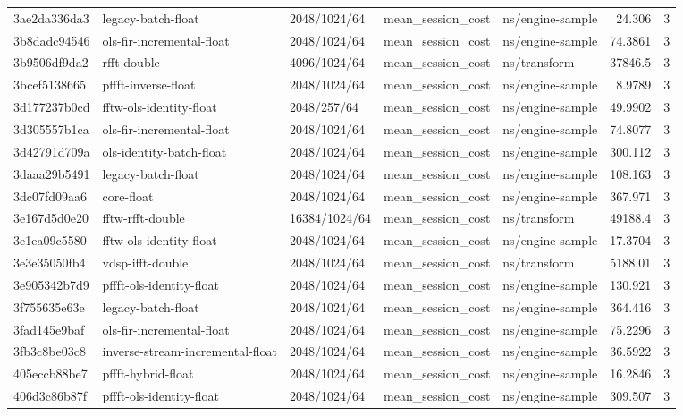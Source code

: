 \begin{longtable}{lllllrr}
3ae2da336da3 & legacy-batch-float & 2048/1024/64 & mean\_session\_cost & ns/engine-sample & 24.306 & 3 \\
3b8dadc94546 & ols-fir-incremental-float & 2048/1024/64 & mean\_session\_cost & ns/engine-sample & 74.3861 & 3 \\
3b9506df9da2 & rfft-double & 4096/1024/64 & mean\_session\_cost & ns/transform & 37846.5 & 3 \\
3bcef5138665 & pffft-inverse-float & 2048/1024/64 & mean\_session\_cost & ns/engine-sample & 8.9789 & 3 \\
3d177237b0cd & fftw-ols-identity-float & 2048/257/64 & mean\_session\_cost & ns/engine-sample & 49.9902 & 3 \\
3d305557b1ca & ols-fir-incremental-float & 2048/1024/64 & mean\_session\_cost & ns/engine-sample & 74.8077 & 3 \\
3d42791d709a & ols-identity-batch-float & 2048/1024/64 & mean\_session\_cost & ns/engine-sample & 300.112 & 3 \\
3daaa29b5491 & legacy-batch-float & 2048/1024/64 & mean\_session\_cost & ns/engine-sample & 108.163 & 3 \\
3dc07fd09aa6 & core-float & 2048/1024/64 & mean\_session\_cost & ns/engine-sample & 367.971 & 3 \\
3e167d5d0e20 & fftw-rfft-double & 16384/1024/64 & mean\_session\_cost & ns/transform & 49188.4 & 3 \\
3e1ea09c5580 & fftw-ols-identity-float & 2048/1024/64 & mean\_session\_cost & ns/engine-sample & 17.3704 & 3 \\
3e3e35050fb4 & vdsp-ifft-double & 2048/1024/64 & mean\_session\_cost & ns/transform & 5188.01 & 3 \\
3e905342b7d9 & pffft-ols-identity-float & 2048/1024/64 & mean\_session\_cost & ns/engine-sample & 130.921 & 3 \\
3f755635e63e & legacy-batch-float & 2048/1024/64 & mean\_session\_cost & ns/engine-sample & 364.416 & 3 \\
3fad145e9baf & ols-fir-incremental-float & 2048/1024/64 & mean\_session\_cost & ns/engine-sample & 75.2296 & 3 \\
3fb3c8be03c8 & inverse-stream-incremental-float & 2048/1024/64 & mean\_session\_cost & ns/engine-sample & 36.5922 & 3 \\
405eccb88be7 & pffft-hybrid-float & 2048/1024/64 & mean\_session\_cost & ns/engine-sample & 16.2846 & 3 \\
406d3c86b87f & pffft-ols-identity-float & 2048/1024/64 & mean\_session\_cost & ns/engine-sample & 309.507 & 3 \\

\end{longtable}
